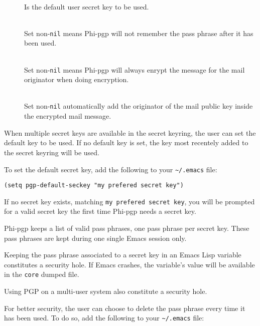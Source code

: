 {\leftmargini 2cm %
\begin{description}
\item[]\hfill\\
Is the default user secret key to be used.

\item[]\hfill\\
Set non-{\tt  nil} means Phi-pgp will  not  remember the pass phrase
after it has been used.

\item[]\hfill\\
Set non-{\tt  nil} means Phi-pgp will always  enrypt the message for
the mail originator when doing encryption.

\item[]\hfill\\
Set non-{\tt nil} automatically add the  originator of the mail public
key inside the encrypted mail message.
\end{description}}

When multiple  secret keys are  available in the secret keyring, the
user  can set the  default key to be used. If  no default key  is set, the
key most recentely added to the secret keyring will be used.

To set the     default secret   key,   add  the   following  to   your
\verb+~/.emacs+ file:

\begin{verbatim}
(setq pgp-default-seckey "my prefered secret key")
\end{verbatim}

If no secret key  exists, matching {\tt my  prefered secret key},  you
will be prompted for a valid secret key the first time Phi-pgp needs a
secret key.

Phi-pgp keeps a list of valid pass  phrases, one pass phrase per secret
key. These pass phrases are kept during one single Emacs session only.

Keeping the  pass phrase associated to a  secret key in an  Emacs Lisp
variable  constitutes a   security   hole.   If Emacs   crashes,   the
variable's value will be available in the {\tt core} dumped file.

Using PGP on a multi-user system also constitute a security hole.

For better  security,  the user can choose  to  delete the pass phrase
every time  it has been   used. To do so,  add  the following to  your
\verb+~/.emacs+ file:


